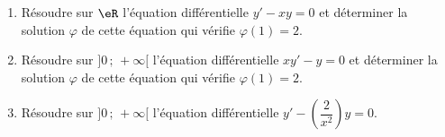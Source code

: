 
\begin{exercice}\label{exoautoanalyseCTU-33}

 
\begin{enumerate}
\item  Résoudre sur $\eR$ l'équation différentielle $y'-xy=0$ et déterminer la solution $\varphi$ de cette équation qui vérifie $\varphi(1)=2$.
\item Résoudre sur $]0\,;\,+\infty[$ l'équation différentielle $xy'-y=0$ et déterminer la solution $\varphi$ de cette équation qui vérifie $\varphi(1)=2$.
\item Résoudre sur $]0\,;\,+\infty[$ l'équation différentielle $y'-\left(\dfrac{2}{x^2}\right)y=0$.
\end{enumerate}




\end{exercice}
